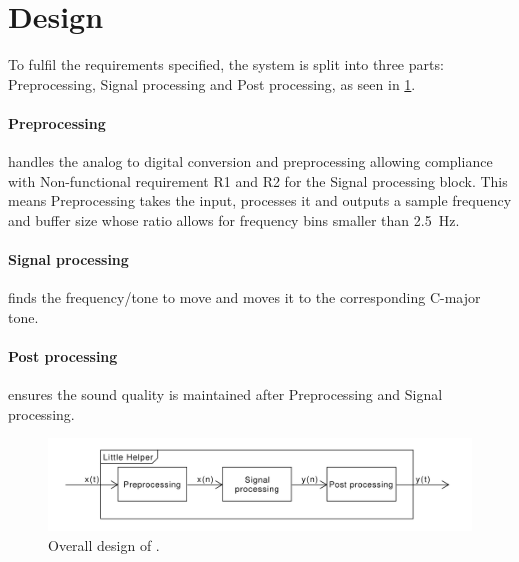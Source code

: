 
\section{Design}
\label{ch:Design}

To fulfil the requirements specified, the system is split into three parts: Preprocessing, Signal processing and Post processing, as seen in \cref{fig:overalldesign}.

\paragraph{Preprocessing} handles the analog to digital conversion and preprocessing allowing compliance with Non-functional requirement R1 and R2 for the Signal processing block.
This means Preprocessing takes the input, processes it and outputs a sample frequency and buffer size whose ratio allows for frequency bins smaller than \SI{2.5}{\hertz}.

\paragraph{Signal processing} finds the frequency/tone to move and moves it to the corresponding C-major tone.

\paragraph{Post processing} ensures the sound quality is maintained after Preprocessing and Signal processing.

\begin{figure}
	\centering
	\includegraphics[width=1\linewidth]{gfx/Design/OverallDesign.pdf}
	\caption{Overall design of \systemName.}
	\label{fig:overalldesign}
\end{figure}


\FloatBarrier